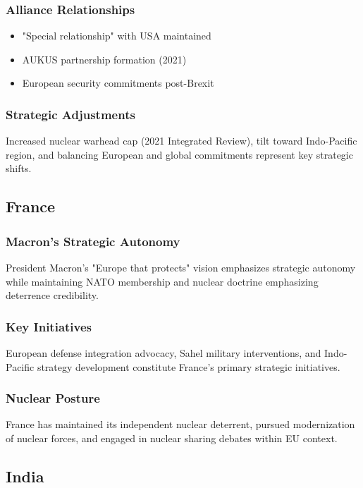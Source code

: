 \documentclass[a4paper, 11pt]{article}
\begin{document}
\subsubsection{Alliance Relationships}
\begin{itemize}
	\item "Special relationship" with USA maintained
	\item AUKUS partnership formation (2021)
	\item European security commitments post-Brexit
\end{itemize}

\subsubsection{Strategic Adjustments}
Increased nuclear warhead cap (2021 Integrated Review), tilt toward Indo-Pacific region, and balancing European and global commitments represent key strategic shifts.

\subsection{France}

\subsubsection{Macron's Strategic Autonomy}
President Macron's "Europe that protects" vision emphasizes strategic autonomy while maintaining NATO membership and nuclear doctrine emphasizing deterrence credibility.

\subsubsection{Key Initiatives}
European defense integration advocacy, Sahel military interventions, and Indo-Pacific strategy development constitute France's primary strategic initiatives.

\subsubsection{Nuclear Posture}
France has maintained its independent nuclear deterrent, pursued modernization of nuclear forces, and engaged in nuclear sharing debates within EU context.

\subsection{India}
\end{document}
